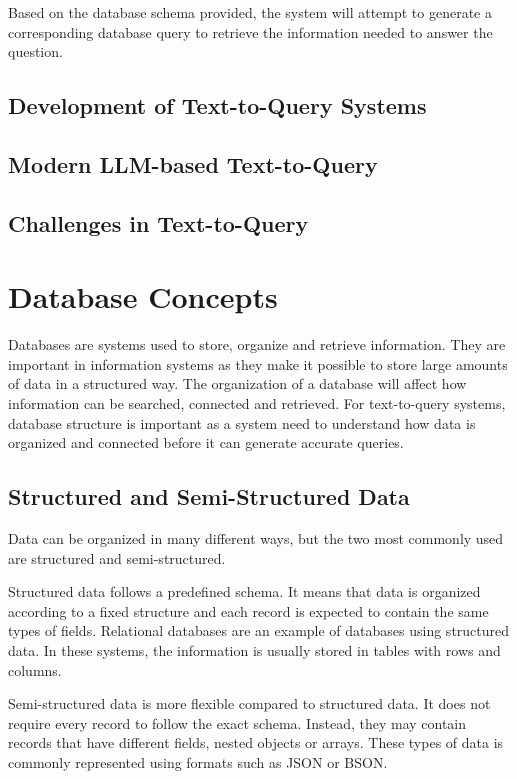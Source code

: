 Based on the database schema provided, the system will attempt to generate a corresponding database query to retrieve the information needed to answer the question. 


\subsection{Development of Text-to-Query Systems}
\subsection{Modern LLM-based Text-to-Query}
\subsection{Challenges in Text-to-Query}

\section{Database Concepts}

Databases are systems used to store, organize and retrieve information. They are important in information systems as they make it possible to store large amounts of data in a structured way. The organization of a database will affect how information can be searched, connected and retrieved. For text-to-query systems, database structure is important as a system need to understand how data is organized and connected before it can generate accurate queries. 


\subsection{Structured and Semi-Structured Data}

Data can be organized in many different ways, but the two most commonly used are structured and semi-structured. 

Structured data follows a predefined schema. It means that data is organized according to a fixed structure and each record is expected to contain the same types of fields. Relational databases are an example of databases using structured data. In these systems, the information is usually stored in tables with rows and columns. 

Semi-structured data is more flexible compared to structured data. It does not require every record to follow the exact schema. Instead, they may contain records that have different fields, nested objects or arrays. These types of data is commonly represented using formats such as JSON or BSON. 


